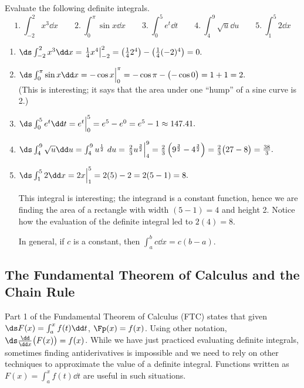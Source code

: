 \begin{example}\label{ex_ftc4}%
Evaluate the following definite integrals.
\[
1.\ \int_{-2}^2 x^3\dd x \qquad 2.\ \int_0^\pi \sin x\dd x \qquad
3.\ \int_0^5 e^t\dd t \qquad 4.\ \int_4^9 \sqrt{u}\dd u\qquad 5.\ \int_1^5 2\dd x
\]
\vspace{-10pt}
\solution
\begin{enumerate}
\item	$\ds \int_{-2}^2 x^3\dd x = \left.\frac14x^4\right|_{-2}^2 = \left(\frac142^4\right) - \left(\frac14(-2)^4\right) = 0.$
\item	$\ds \int_0^\pi \sin x\dd x = -\cos x\Big|_0^\pi = -\cos \pi- \bigl(-\cos 0\bigr) = 1+1=2.$ \\
(This is interesting; it says that the area under one ``hump'' of a sine curve is 2.)
\item	$\ds \int_0^5e^t\dd t = e^t\Big|_0^5 = e^5 - e^0 = e^5-1 \approx 147.41.$
\item	$\ds \int_4^9 \sqrt{u}\dd u = \int_4^9 u^\frac12\ du = \left.\frac23u^\frac32\right|_4^9 = \frac23\left(9^\frac32-4^\frac32\right) = \frac23\bigl(27-8\bigr) =\frac{38}3.$
\item	$\ds \int_1^5 2\dd x = 2x\Big|_1^5 = 2(5)-2=2(5-1)=8.$ 

This integral is interesting; the integrand is a constant function, hence we are finding the area of a rectangle with width $(5-1)=4$ and height 2. Notice how the evaluation of the definite integral led to $2(4)=8$. 

In general, if $c$ is a constant, then $\int_a^b c\dd x = c(b-a)$.
\end{enumerate}
\end{example}

\subsection{The Fundamental Theorem of Calculus and the Chain Rule}

Part 1 of the Fundamental Theorem of Calculus (FTC) states that given $\ds F(x) = \int_a^x f(t)\dd t$,  $\Fp(x) = f(x)$. Using other notation, $\ds \frac{\dd}{\dd x}\bigl(F(x)\bigr) = f(x)$. While we have just practiced evaluating definite integrals, sometimes finding antiderivatives is impossible and we need to rely on other techniques to approximate the value of a definite integral. Functions written as $F(x) = \int_a^x f(t)\dd t$ are useful in such situations.

